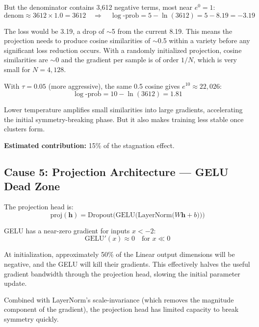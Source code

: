 \documentclass[11pt,a4paper]{article}
\begin{document}
But the denominator contains 3{,}612 negative terms, most near $e^0 = 1$:
\begin{equation}
\text{denom} \approx 3612 \times 1.0 = 3612 \quad\Rightarrow\quad
\log\text{-prob} = 5 - \ln(3612) = 5 - 8.19 = -3.19
\end{equation}

The loss would be 3.19, a drop of $\sim$5 from the current 8.19. This means the
projection needs to produce cosine similarities of $\sim$0.5 within a variety before
any significant loss reduction occurs. With a randomly initialized projection, cosine
similarities are $\sim$0 and the gradient per sample is of order $1/N$, which is very
small for $N = 4{,}128$.

\medskip
\noindent
With $\tau = 0.05$ (more aggressive), the same 0.5 cosine gives $e^{10} \approx 22{,}026$:
\begin{equation}
\log\text{-prob} = 10 - \ln(3612) = 1.81
\end{equation}

Lower temperature amplifies small similarities into large gradients, accelerating
the initial symmetry-breaking phase. But it also makes training less stable once
clusters form.

\medskip
\noindent\textbf{Estimated contribution:} 15\% of the stagnation effect.

\subsection{Cause 5: Projection Architecture --- GELU Dead Zone}
\label{sec:cause5}

The projection head is:
\begin{equation}
\text{proj}(\mathbf{h}) = \text{Dropout}\bigl(\text{GELU}\bigl(\text{LayerNorm}\bigl(W\mathbf{h} + b\bigr)\bigr)\bigr)
\end{equation}

GELU has a near-zero gradient for inputs $x < -2$:
\begin{equation}
\text{GELU}'(x) \approx 0 \quad\text{for } x \ll 0
\end{equation}

At initialization, approximately 50\% of the Linear output dimensions will be negative,
and the GELU will kill their gradients. This effectively halves the useful gradient
bandwidth through the projection head, slowing the initial parameter update.

Combined with LayerNorm's scale-invariance (which removes the magnitude component of
the gradient), the projection head has limited capacity to break symmetry quickly.
\end{document}
